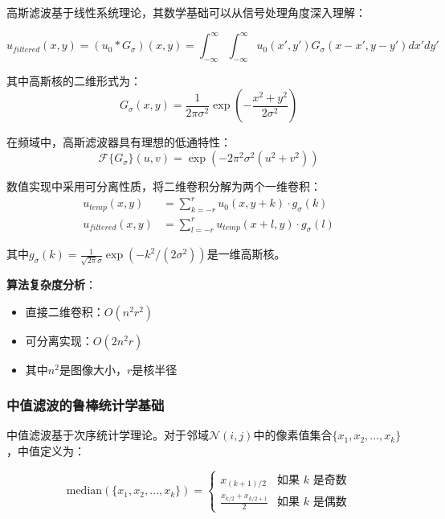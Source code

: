 \documentclass[a4paper,12pt]{ctexart}
\begin{document}
高斯滤波基于线性系统理论，其数学基础可以从信号处理角度深入理解：

\begin{equation}
u_{filtered}(x,y) = (u_0 * G_\sigma)(x,y) = \int_{-\infty}^{\infty} \int_{-\infty}^{\infty} u_0(x',y') G_\sigma(x-x',y-y') dx' dy'
\end{equation}

其中高斯核的二维形式为：
\begin{equation}
G_\sigma(x,y) = \frac{1}{2\pi\sigma^2} \exp\left(-\frac{x^2+y^2}{2\sigma^2}\right)
\end{equation}

在频域中，高斯滤波器具有理想的低通特性：
\begin{equation}
\mathcal{F}\{G_\sigma\}(u,v) = \exp\left(-2\pi^2\sigma^2(u^2+v^2)\right)
\end{equation}

数值实现中采用可分离性质，将二维卷积分解为两个一维卷积：
\begin{align}
u_{temp}(x,y) &= \sum_{k=-r}^{r} u_0(x,y+k) \cdot g_\sigma(k) \\
u_{filtered}(x,y) &= \sum_{l=-r}^{r} u_{temp}(x+l,y) \cdot g_\sigma(l)
\end{align}

其中$g_\sigma(k) = \frac{1}{\sqrt{2\pi}\sigma} \exp(-k^2/(2\sigma^2))$是一维高斯核。

\textbf{算法复杂度分析}：
\begin{itemize}
    \item 直接二维卷积：$O(n^2 r^2)$
    \item 可分离实现：$O(2n^2 r)$
    \item 其中$n^2$是图像大小，$r$是核半径
\end{itemize}

\subsubsection{中值滤波的鲁棒统计学基础}

中值滤波基于次序统计学理论。对于邻域$\mathcal{N}(i,j)$中的像素值集合$\{x_1, x_2, \ldots, x_k\}$，中值定义为：

\begin{equation}
\text{median}(\{x_1, x_2, \ldots, x_k\}) = \begin{cases}
x_{(k+1)/2} & \text{如果 } k \text{ 是奇数} \\
\frac{x_{k/2} + x_{k/2+1}}{2} & \text{如果 } k \text{ 是偶数}
\end{cases}
\end{equation}
\end{document}
